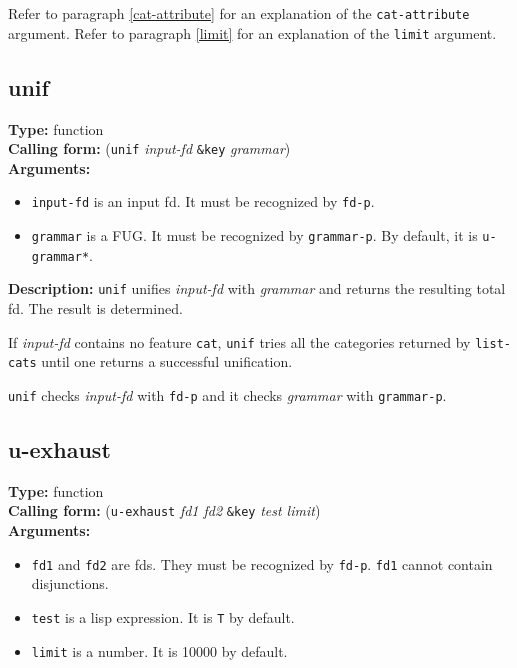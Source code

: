 \documentclass[10pt,a4paper]{report}
\begin{document}
Refer to paragraph \ref{cat-attribute} for an explanation of the
{\tt cat-attribute} argument.
Refer to paragraph \ref{limit} for an explanation of the {\tt limit} argument.


\subsection{unif}

{\bf Type:} function
\\{\bf Calling form:} ({\tt unif} {\em input-fd} {\tt \&key} {\em grammar})
\\{\bf Arguments:} 
\begin{itemize}
\item {\tt input-fd} is an input fd. It must be recognized by {\tt fd-p}.

\item {\tt grammar} is a FUG. It must be recognized by {\tt grammar-p}. By
default, it is {\tt *u-grammar*}.

\end{itemize}

{\bf Description:} {\tt unif} unifies {\em input-fd} with {\em grammar}
and returns the resulting total fd. The result is determined.
  

If {\em input-fd} contains no feature {\tt cat}, {\tt unif} tries all
the categories returned by {\tt list-cats} until one returns a
successful unification. 

{\tt unif} checks {\em input-fd} with {\tt fd-p}
and it checks {\em grammar} with {\tt grammar-p}.  


\subsection{u-exhaust}

{\bf Type:} function
\\{\bf Calling form:} ({\tt u-exhaust} {\em fd1 fd2} {\tt \&key} {\em test limit})
\\{\bf Arguments:} 
\begin{itemize}
\item {\tt fd1} and {\tt fd2} are fds. They must be recognized by {\tt fd-p}.
{\tt fd1} cannot contain disjunctions.

\item {\tt test} is a lisp expression.  It is {\tt T} by default.

\item {\tt limit} is a number.  It is 10000 by default.
\end{itemize}
\end{document}

